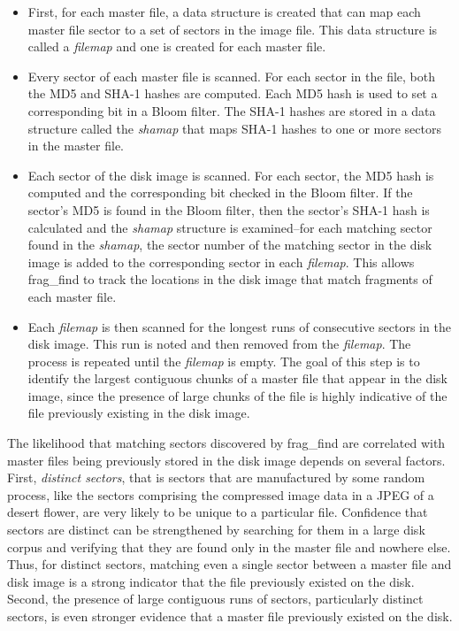 \begin{itemize}

\item First, for each master file, a data structure is created that can map each master file sector to a set of sectors in the image file. This data structure is called a \emph{filemap} and one is created for each master 
file.

\item Every sector of each master file is scanned. For each sector in the file, both the MD5 and SHA-1 hashes are computed. Each MD5 hash is used to set a corresponding bit in a Bloom filter. The
SHA-1 hashes are stored in a data structure called the \emph{shamap} that maps SHA-1 hashes to one or more sectors in the master file.  

\item Each sector of the disk image is scanned. For each sector, the MD5 hash is computed and the corresponding bit checked in the Bloom filter.  If the sector’s MD5 is found in the Bloom filter, then 
the sector’s SHA-1 hash is calculated and the \emph{shamap} structure is examined--for each matching sector found in the \emph{shamap}, the sector number of the matching sector in the disk image is added to the corresponding sector in each \emph{filemap}.  This allows frag\_find to track the locations in the disk image that match fragments of each master file. 

\item Each \emph{filemap} is then scanned for the longest runs of consecutive sectors in the disk image.    This run is noted and then removed from the \emph{filemap}. The process is repeated until the \emph{filemap} is empty.  The goal of this step is to identify the largest contiguous chunks of a master file that appear in the disk image, since the presence of large chunks of the file is highly indicative of the file previously existing in the disk image.

\end{itemize}

The likelihood that matching sectors discovered by frag\_find are correlated with master files being  previously stored in the disk image depends on several factors.  First, \emph{distinct sectors}, that is sectors that are manufactured by some random process, like the sectors comprising the compressed image data in a JPEG of a desert flower, are very likely to be unique to a particular file. Confidence that sectors are distinct can be strengthened by searching for them in a large disk corpus and verifying that they are found only in the master file and nowhere else.  Thus, for distinct sectors, matching even a single sector between a master file and disk image is a strong indicator that the file previously existed on the disk.  Second, the presence of large contiguous runs of sectors, particularly distinct sectors, is even stronger evidence that a master file previously existed on the disk.


